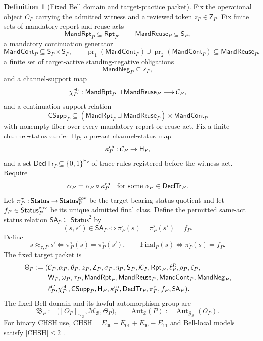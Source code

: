 \documentclass[11pt]{article}
\theoremstyle{definition}
\newtheorem{definition}[theorem]{Definition}
\newcommand{\CHSH}{\mathrm{CHSH}}
\newcommand{\Bell}{\mathcal{B}}
\newcommand{\BellDom}{\mathfrak{B}}
\newcommand{\BellLaw}{\mathscr{G}_{\Bell}}
\newcommand{\BellEq}{\simeq_{\Bell}}
\newcommand{\AutBell}{\mathrm{Aut}_{\Bell}(P)}
\newcommand{\MandRpt}{\mathsf{MandRpt}}
\newcommand{\MandReuse}{\mathsf{MandReuse}}
\newcommand{\MandCont}{\mathsf{MandCont}}
\newcommand{\MandNeg}{\mathsf{MandNeg}}
\newcommand{\FinalP}{\mathrm{Final}_{P}}
\newcommand{\StatusEq}{\approx_{\tau,P}}
\newcommand{\ContSupp}{\mathsf{CSupp}_{P}}
\begin{document}
\begin{definition}[Fixed Bell domain and target-practice packet]\label{def:fixedbelldomain}
Fix the operational object $O_P$ carrying the admitted witness and a reviewed token $z_P\in\mathsf Z_P$. Fix finite sets of mandatory report and reuse acts
\[
\MandRpt_P\subseteq\mathsf{Rpt}_P,
\qquad
\MandReuse_P\subseteq\mathsf S_P,
\]
a mandatory continuation generator
\[
\MandCont_P\subseteq\mathsf S_P\times\mathsf S_P,
\qquad
\operatorname{pr}_1(\MandCont_P)\cup\operatorname{pr}_2(\MandCont_P)
\subseteq\MandReuse_P,
\]
a finite set of target-active standing-negative obligations
\[
\MandNeg_P\subseteq\mathsf Z_P,
\]
and a channel-support map
\[
\chi_P^{\rm ch}:\MandRpt_P\sqcup\MandReuse_P\longrightarrow\mathcal C_P,
\]
and a continuation-support relation
\[
\ContSupp\subseteq(\MandRpt_P\sqcup\MandReuse_P)\times\MandCont_P
\]
with nonempty fiber over every mandatory report or reuse act. Fix a finite channel-status carrier $\mathsf H_P$, a pre-act channel-status map
\[
\kappa_P^{\rm ch}:\mathcal C_P\to\mathsf H_P,
\]
and a set $\mathsf{DeclTr}_P\subseteq\{0,1\}^{\mathsf H_P}$ of trace rules registered before the witness act. Require
\[
\alpha_P=\bar\alpha_P\circ\kappa_P^{\rm ch}
\quad\text{for some }\bar\alpha_P\in\mathsf{DeclTr}_P.
\]
Let $\pi_P^{\tau}:\mathsf{Status}\to\mathsf{Status}^{\rm gov}_P$ be the target-bearing status quotient and let $f_P\in\mathsf{Status}^{\rm gov}_P$ be its unique admitted final class. Define the permitted same-act status relation $\mathsf{SA}_P\subseteq\mathsf{Status}^2$ by
\[
(s,s')\in\mathsf{SA}_P
\iff
\pi_P^{\tau}(s)=\pi_P^{\tau}(s')=f_P.
\]
Define
\[
s\StatusEq s'\iff \pi_P^{\tau}(s)=\pi_P^{\tau}(s'),
\qquad
\FinalP(s)\iff\pi_P^{\tau}(s)=f_P.
\]
The fixed target packet is
\[
\begin{aligned}
\Theta_P:=(&\mathcal C_P,\alpha_P,\theta_P,z_P,\mathsf Z_P,\sigma_P,\eta_P,
\mathsf S_P,\mathcal K_P,\mathsf{Rpt}_P,\ell_P^R,\rho_P,\zeta_P,\\
&\mathsf W_P,\omega_P,\tau_P,\MandRpt_P,\MandReuse_P,\MandCont_P,\MandNeg_P,\\
&\ell_P^C,\chi_P^{\rm ch},\ContSupp,\mathsf H_P,\kappa_P^{\rm ch},\mathsf{DeclTr}_P,\pi_P^{\tau},f_P,\mathsf{SA}_P).
\end{aligned}
\]
The fixed Bell domain and its lawful automorphism group are
\[
\BellDom_P:=\bigl([O_P]_{\BellEq},\mathcal M_{\Bell},\Theta_P\bigr),
\qquad
\AutBell:=\operatorname{Aut}_{\BellLaw}(O_P).
\]
For binary CHSH use, $\CHSH=E_{00}+E_{01}+E_{10}-E_{11}$ and Bell-local models satisfy $|\CHSH|\le2$ \cite{Bell1964,CHSH1969,Brunner2014}.
\end{definition}
\end{document}
